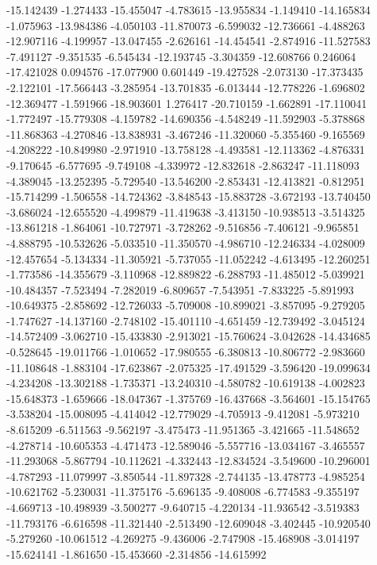 -15.142439
-1.274433
-15.455047
-4.783615
-13.955834
-1.149410
-14.165834
-1.075963
-13.984386
-4.050103
-11.870073
-6.599032
-12.736661
-4.488263
-12.907116
-4.199957
-13.047455
-2.626161
-14.454541
-2.874916
-11.527583
-7.491127
-9.351535
-6.545434
-12.193745
-3.304359
-12.608766
0.246064
-17.421028
0.094576
-17.077900
0.601449
-19.427528
-2.073130
-17.373435
-2.122101
-17.566443
-3.285954
-13.701835
-6.013444
-12.778226
-1.696802
-12.369477
-1.591966
-18.903601
1.276417
-20.710159
-1.662891
-17.110041
-1.772497
-15.779308
-4.159782
-14.690356
-4.548249
-11.592903
-5.378868
-11.868363
-4.270846
-13.838931
-3.467246
-11.320060
-5.355460
-9.165569
-4.208222
-10.849980
-2.971910
-13.758128
-4.493581
-12.113362
-4.876331
-9.170645
-6.577695
-9.749108
-4.339972
-12.832618
-2.863247
-11.118093
-4.389045
-13.252395
-5.729540
-13.546200
-2.853431
-12.413821
-0.812951
-15.714299
-1.506558
-14.724362
-3.848543
-15.883728
-3.672193
-13.740450
-3.686024
-12.655520
-4.499879
-11.419638
-3.413150
-10.938513
-3.514325
-13.861218
-1.864061
-10.727971
-3.728262
-9.516856
-7.406121
-9.965851
-4.888795
-10.532626
-5.033510
-11.350570
-4.986710
-12.246334
-4.028009
-12.457654
-5.134334
-11.305921
-5.737055
-11.052242
-4.613495
-12.260251
-1.773586
-14.355679
-3.110968
-12.889822
-6.288793
-11.485012
-5.039921
-10.484357
-7.523494
-7.282019
-6.809657
-7.543951
-7.833225
-5.891993
-10.649375
-2.858692
-12.726033
-5.709008
-10.899021
-3.857095
-9.279205
-1.747627
-14.137160
-2.748102
-15.401110
-4.651459
-12.739492
-3.045124
-14.572409
-3.062710
-15.433830
-2.913021
-15.760624
-3.042628
-14.434685
-0.528645
-19.011766
-1.010652
-17.980555
-6.380813
-10.806772
-2.983660
-11.108648
-1.883104
-17.623867
-2.075325
-17.491529
-3.596420
-19.099634
-4.234208
-13.302188
-1.735371
-13.240310
-4.580782
-10.619138
-4.002823
-15.648373
-1.659666
-18.047367
-1.375769
-16.437668
-3.564601
-15.154765
-3.538204
-15.008095
-4.414042
-12.779029
-4.705913
-9.412081
-5.973210
-8.615209
-6.511563
-9.562197
-3.475473
-11.951365
-3.421665
-11.548652
-4.278714
-10.605353
-4.471473
-12.589046
-5.557716
-13.034167
-3.465557
-11.293068
-5.867794
-10.112621
-4.332443
-12.834524
-3.549600
-10.296001
-4.787293
-11.079997
-3.850544
-11.897328
-2.744135
-13.478773
-4.985254
-10.621762
-5.230031
-11.375176
-5.696135
-9.408008
-6.774583
-9.355197
-4.669713
-10.498939
-3.500277
-9.640715
-4.220134
-11.936542
-3.519383
-11.793176
-6.616598
-11.321440
-2.513490
-12.609048
-3.402445
-10.920540
-5.279260
-10.061512
-4.269275
-9.436006
-2.747908
-15.468908
-3.014197
-15.624141
-1.861650
-15.453660
-2.314856
-14.615992
